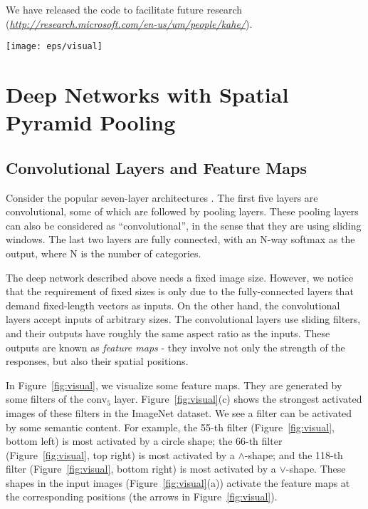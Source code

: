 \documentclass[10pt,journal,cspaper,compsoc]{IEEEtran}
\begin{document}
We have released the code to facilitate future research (\emph{\small\url{http://research.microsoft.com/en-us/um/people/kahe/}}).

\begin{figure*}[t]
\center
\texttt{[image: eps/visual]}
\caption{Visualization of the feature maps. (a) Two images in Pascal VOC 2007. (b) The feature maps of some conv$_5$ filters. The arrows indicate the strongest responses and their corresponding positions in the images. (c) The ImageNet images that have the strongest responses of the corresponding filters. The green rectangles mark the receptive fields of the strongest responses.}
\label{fig:visual}
\end{figure*}

\section{Deep Networks with Spatial Pyramid Pooling}

\subsection{Convolutional Layers and Feature Maps}

Consider the popular seven-layer architectures \cite{Krizhevsky2012,Zeiler2013}. The first five layers are convolutional, some of which are followed by pooling layers. These pooling layers can also be considered as ``convolutional'', in the sense that they are using sliding windows. The last two layers are fully connected, with an N-way softmax as the output, where N is the number of categories.

The deep network described above needs a fixed image size.
However, we notice that the requirement of fixed sizes is only due to the fully-connected layers that demand fixed-length vectors as inputs. On the other hand, the convolutional layers accept inputs of arbitrary sizes. The convolutional layers use sliding filters, and their outputs have roughly the same aspect ratio as the inputs.
These outputs are known as \emph{feature maps} \cite{LeCun1989} - they involve not only the strength of the responses, but also their spatial positions.

In Figure~\ref{fig:visual}, we visualize some feature maps. They are generated by some filters of the conv$_5$ layer. Figure~\ref{fig:visual}(c) shows the strongest activated images of these filters in the ImageNet dataset. We see a filter can be activated by some semantic content. For example, the 55-th filter (Figure~\ref{fig:visual}, bottom left) is most activated by a circle shape; the 66-th filter (Figure~\ref{fig:visual}, top right) is most activated by a $\wedge$-shape; and the 118-th filter (Figure~\ref{fig:visual}, bottom right) is most activated by a $\vee$-shape. These shapes in the input images (Figure~\ref{fig:visual}(a)) activate the feature maps at the corresponding positions (the arrows in Figure~\ref{fig:visual}).
\end{document}
